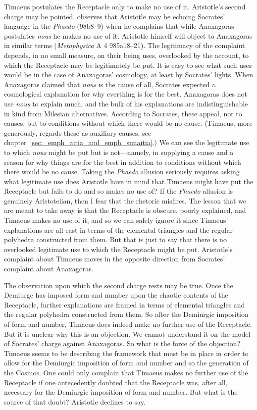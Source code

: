 Timaeus postulates the Receptacle only to make no use of it. Aristotle's second charge may be pointed. \citet[40]{Gregory:2003aa} observes that Aristotle may be echoing Socrates' language in the \emph{Phaedo} (98b8--9) when he complains that while Anaxagoras postulates \emph{nous} he makes no use of it. Aristotle himself will object to Anaxagoras in similar terms (\emph{Metaphysica} A 4 985a18--21). The legitimacy of the complaint depends, in no small measure, on their being uses, overlooked by the account, to which the Receptacle may be legitimately be put. It is easy to see what such uses would be in the case of Anaxagoras' cosmology, at least by Socrates' lights. When Anaxagoras claimed that \emph{nous} is the cause of all, Socrates expected a cosmological explanation for why everthing is for the best. Anaxagoras does not use \emph{nous} to explain much, and the bulk of his explanations are indistinguishable in kind from Milesian alternatives. According to Socrates, these appeal, not to causes, but to conditions without which there would be no cause. (Timaeus, more generously, regards these as auxiliary causes, see chapter~\ref{sec:_emph_aitia_and_emph_sunaitia}.) We can see the legitimate use to which \emph{nous} might be put but is not---namely, in supplying a cause and a reason for why things are for the best in addition to conditions without which there would be no cause. Taking the \emph{Phaedo} allusion seriously requires asking what legitimate use does Aristotle have in mind that Timaeus might have put the Receptacle but fails to do and so makes no use of? If the \emph{Phaedo} allusion is genuinely Aristotelian, then I fear that the rhetoric misfires. The lesson that we are meant to take away is that the Receptacle is obscure, poorly explained, and Timaeus makes no use of it, and so we can safely ignore it since Timaeus' explanations are all cast in terms of the elemental triangles and the regular polyhedra constructed from them. But that is just to say that there is no overlooked legitimate use to which the Receptacle might be put. Aristotle's complaint about Timaeus moves in the opposite direction from Socrates' complaint about Anaxagoras.

The observation upon which the second charge rests may be true. Once the Demiurge has imposed form and number upon the chaotic contents of the Receptacle, further explanations are framed in terms of elemental triangles and the regular polyhedra constructed from them. So after the Demiurgic imposition of form and number, Timaeus does indeed make no further use of the Receptacle. But it is unclear why this is an objection. We cannot understand it on the model of Socrates' charge against Anaxagoras. So what is the force of the objection? Timaeus seems to be describing the framework that must be in place in order to allow for the Demiurgic imposition of form and number and so the generation of the Cosmos. One could only complain that Timaeus makes no further use of the Receptacle if one antecedently doubted that the Receptacle was, after all, necessary for the Demiurgic imposition of form and number. But what is the source of that doubt? Aristotle declines to say.

